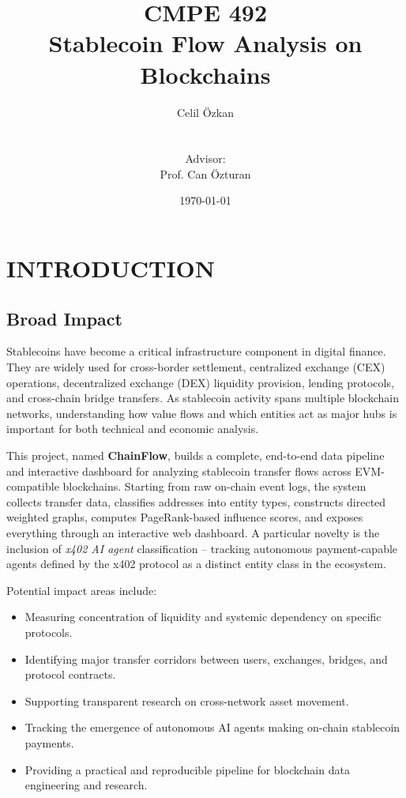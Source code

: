 \documentclass[a4paper,12pt]{report}
\begin{document}
\title{CMPE 492 \\ Stablecoin Flow Analysis on Blockchains}
\author{
Celil \"{O}zkan \\
\\ \\
Advisor: \\
Prof. Can \"{O}zturan
}
\date{\today}
\maketitle{}
\tableofcontents

\chapter{INTRODUCTION}

\section{Broad Impact}

Stablecoins have become a critical infrastructure component in digital finance. They are widely
used for cross-border settlement, centralized exchange (CEX) operations, decentralized exchange
(DEX) liquidity provision, lending protocols, and cross-chain bridge transfers. As stablecoin
activity spans multiple blockchain networks, understanding how value flows and which entities act
as major hubs is important for both technical and economic analysis.

This project, named \textbf{ChainFlow}, builds a complete, end-to-end data pipeline and
interactive dashboard for analyzing stablecoin transfer flows across EVM-compatible blockchains.
Starting from raw on-chain event logs, the system collects transfer data, classifies addresses into
entity types, constructs directed weighted graphs, computes PageRank-based influence scores, and
exposes everything through an interactive web dashboard. A particular novelty is the inclusion of
\textit{x402 AI agent} classification -- tracking autonomous payment-capable agents defined
by the x402 protocol as a distinct entity class in the ecosystem.

Potential impact areas include:
\begin{itemize}
\item Measuring concentration of liquidity and systemic dependency on specific protocols.
\item Identifying major transfer corridors between users, exchanges, bridges, and protocol contracts.
\item Supporting transparent research on cross-network asset movement.
\item Tracking the emergence of autonomous AI agents making on-chain stablecoin payments.
\item Providing a practical and reproducible pipeline for blockchain data engineering and research.
\end{itemize}
\end{document}
